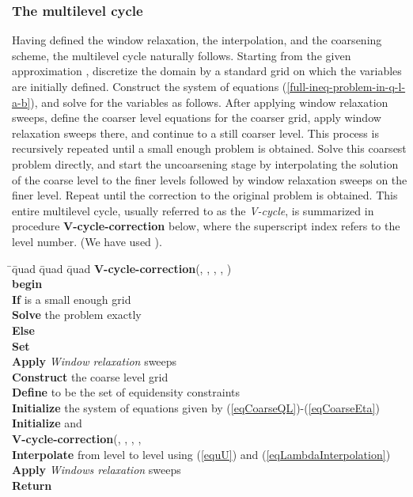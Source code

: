 \documentclass[final]{siamltex}
\newcommand{\keyw}[1]{{\bf #1}}
\begin{document}
\subsubsection{The multilevel cycle}\label{sMultilevel-cycle}
\par Having defined the window relaxation, the interpolation, and
the coarsening scheme, the multilevel cycle naturally follows.
Starting from the given approximation ,
discretize the domain by a standard grid on which the 
variables are initially defined. Construct the system of equations
(\ref{full-ineq-problem-in-q-l-a-b}), and solve for the 
variables as follows. After applying  window relaxation
sweeps, define the coarser level equations for the coarser grid,
apply  window relaxation sweeps there, and continue to a
still coarser level. This process is recursively repeated until a small
enough problem is obtained. Solve this coarsest problem directly,
and start the uncoarsening stage by interpolating the solution of
the coarse level to the finer levels followed by  window
relaxation sweeps on the finer level. Repeat until the correction
to the original problem is obtained. This entire multilevel cycle,
usually referred to as the {\it V-cycle}, is summarized in
procedure {\bf V-cycle-correction} below, where the superscript
index refers to the level number. (We have used ).
\vspace{6mm}
\begin{tabbing}
  \quad \=\quad \=quad \=quad \=quad         \kill
  {\bf V-cycle-correction}(, , , , )\\
  \keyw{begin}\\
  \> \keyw{If}  is a small enough grid\\
  \>\> \keyw{Solve} the problem exactly\\
  \> \keyw{Else}\\
  \>\> \keyw{Set} \\
  \>\> \keyw{Apply}  {\it Window relaxation} sweeps\\
  \>\> \keyw{Construct}  the coarse level grid\\
  \>\> \keyw{Define}  to be the set of equidensity constraints\\
  \>\> \keyw{Initialize} the system of equations  given by (\ref{eqCoarseQL})-(\ref{eqCoarseEta})\\
  \>\> \keyw{Initialize}  and \\
  \>\> \keyw{V-cycle-correction}(, , , , \\
\>\> \keyw{Interpolate} from level  to level  using (\ref{equU}) and (\ref{eqLambdaInterpolation})\\
    \>\> \keyw{Apply}  {\it Windows relaxation} sweeps\\
   \keyw{Return} \\
\end{tabbing}
\end{document}

